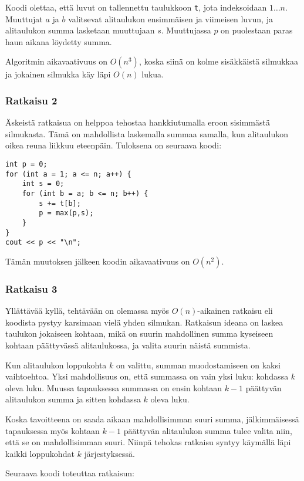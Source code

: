 Koodi olettaa, että luvut on tallennettu taulukkoon \texttt{t},
jota indeksoidaan $1 \ldots n$.
Muuttujat $a$ ja $b$ valitsevat alitaulukon ensimmäisen
ja viimeisen luvun, ja alitaulukon summa lasketaan muuttujaan $s$.
Muuttujassa $p$ on puolestaan paras haun aikana löydetty summa.

Algoritmin aikavaativuus on $O(n^3)$, koska siinä on kolme
sisäkkäistä silmukkaa ja jokainen silmukka käy läpi $O(n)$ lukua.

\subsubsection{Ratkaisu 2}

Äskeistä ratkaisua on helppoa tehostaa hankkiutumalla
eroon sisimmästä silmukasta.
Tämä on mahdollista laskemalla summaa samalla,
kun alitaulukon oikea reuna liikkuu eteenpäin.
Tuloksena on seuraava koodi:

\begin{lstlisting}
int p = 0;
for (int a = 1; a <= n; a++) {
    int s = 0;
    for (int b = a; b <= n; b++) {
        s += t[b];
        p = max(p,s);
    }
}
cout << p << "\n";
\end{lstlisting}
Tämän muutoksen jälkeen koodin aikavaativuus on $O(n^2)$.

\subsubsection{Ratkaisu 3}

Yllättävää kyllä, tehtävään on olemassa myös
$O(n)$-aikainen ratkaisu eli koodista pystyy
karsimaan vielä yhden silmukan.
Ratkaisun ideana on laskea taulukon jokaiseen
kohtaan, mikä on suurin mahdollinen summa
kyseiseen kohtaan päättyvässä alitaulukossa,
ja valita suurin näistä summista.

Kun alitaulukon loppukohta $k$ on valittu,
summan muodostamiseen on kaksi vaihtoehtoa.
Yksi mahdollisuus on, että summassa
on vain yksi luku: kohdassa $k$ oleva luku.
Muussa tapauksessa summassa on ensin
kohtaan $k-1$ päättyvän alitaulukon
summa ja sitten kohdassa $k$ oleva luku.

Koska tavoitteena on saada aikaan mahdollisimman
suuri summa, jälkimmäisessä tapauksessa myös
kohtaan $k-1$ päättyvän alitaulukon summa tulee valita niin,
että se on mahdollisimman suuri.
Niinpä tehokas ratkaisu syntyy käymällä läpi
kaikki loppukohdat $k$ järjestyksessä.

Seuraava koodi toteuttaa ratkaisun:

